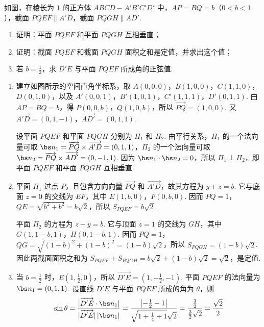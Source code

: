 \begin{problem}
如图，在棱长为 \(1\) 的正方体 \(ABCD - A'B'C'D'\) 中，\(AP = BQ = b\)（\(0 < b < 1\)），截面 \(PQEF \parallel A'D\)，截面 \(PQGH \parallel AD'\).

\begin{enumerate}
\item 证明：平面 \(PQEF\) 和平面 \(PQGH\) 互相垂直；
\item 证明：截面 \(PQEF\) 和截面 \(PQGH\) 面积之和是定值，并求出这个值；
\item 若 \( b = \frac{1}{2} \)，求 \(D'E\) 与平面 \(PQEF\) 所成角的正弦值.
\end{enumerate}

\end{problem}

\begin{solution}
\begin{enumerate}
\item 建立如图所示的空间直角坐标系，取
\(A(0,0,0)\)，\(B(1,0,0)\)，\(C(1,1,0)\)，\(D(0,1,0)\)，以及
\(A'(0,0,1)\)，\(B'(1,0,1)\)，\(C'(1,1,1)\)，\(D'(0,1,1)\). 由 \(AP=BQ=b\)，得 \(P(0,0,b)\)，\(Q(1,0,b)\)，所以 \(\overrightarrow{PQ}=(1,0,0)\). 又 \(\overrightarrow{A'D}=(0,1,-1)\)，\(\overrightarrow{AD'}=(0,1,1)\).

设平面 \(PQEF\) 和平面 \(PQGH\) 分别为 \(\Pi_1\) 和 \(\Pi_2\). 由平行关系，\(\Pi_1\) 的一个法向量可取 \(\bs n_1=\overrightarrow{PQ}\times\overrightarrow{A'D}=(0,1,1)\)，\(\Pi_2\) 的一个法向量可取 \(\bs n_2=\overrightarrow{PQ}\times\overrightarrow{AD'}=(0,-1,1)\). 因为 \(\bs n_1\cdot\bs n_2=0\)，所以 \(\Pi_1\perp\Pi_2\)，即平面 \(PQEF\) 和平面 \(PQGH\) 互相垂直.

\item 平面 \(\Pi_1\) 过点 \(P\)，且包含方向向量 \(\overrightarrow{PQ}\) 和 \(\overrightarrow{A'D}\)，故其方程为 \(y+z=b\). 它与底面 \(z=0\) 的交线为 \(EF\)，其中 \(E(1,b,0)\)，\(F(0,b,0)\). 因而 \(PQ=1\)，\(QE=\sqrt{b^2+b^2}=b\sqrt{2}\)，所以 \(S_{PQEF}=b\sqrt{2}\).

平面 \(\Pi_2\) 的方程为 \(z-y=b\). 它与顶面 \(z=1\) 的交线为 \(GH\)，其中 \(G(1,1-b,1)\)，\(H(0,1-b,1)\). 因而 \(PQ=1\)，\(QG=\sqrt{(1-b)^2+(1-b)^2}=(1-b)\sqrt{2}\)，所以 \(S_{PQGH}=(1-b)\sqrt{2}\). 因此两截面面积之和为 \(S_{PQEF}+S_{PQGH}=b\sqrt{2}+(1-b)\sqrt{2}=\sqrt{2}\)，是定值.

\item 当 \(b=\frac{1}{2}\) 时，\(E(1,\frac{1}{2},0)\)，所以 \(\overrightarrow{D'E}=(1,-\frac{1}{2},-1)\). 平面 \(PQEF\) 的法向量为 \(\bs n_1=(0,1,1)\). 设直线 \(D'E\) 与平面 \(PQEF\) 所成的角为 \(\theta\)，则
\[
\sin\theta=\frac{\lvert\overrightarrow{D'E}\cdot\bs n_1\rvert}{\lvert\overrightarrow{D'E}\rvert\,\lvert\bs n_1\rvert}=\frac{\left\lvert-\frac{1}{2}-1\right\rvert}{\sqrt{1+\frac{1}{4}+1}\sqrt{2}}=\frac{\frac{3}{2}}{\frac{3}{2}\sqrt{2}}=\frac{\sqrt{2}}{2}
\]
\end{enumerate}
\end{solution}

